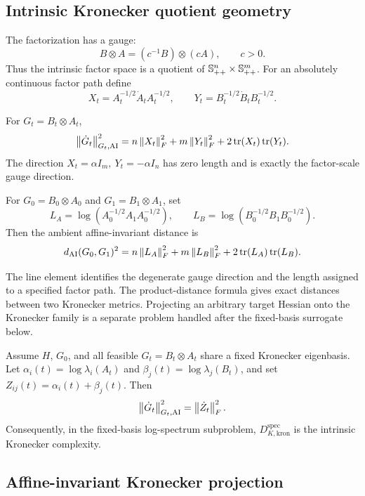 \subsection{Intrinsic Kronecker quotient geometry}

The factorization has a gauge:
\[
  B\otimes A=(c^{-1}B)\otimes(cA),\qquad c>0.
\]
Thus the intrinsic factor space is a quotient of
\(\mathbb S_{++}^n\times\mathbb S_{++}^m\). For an absolutely continuous factor path define
\[
  X_t=A_t^{-1/2}\dot A_tA_t^{-1/2},\qquad
  Y_t=B_t^{-1/2}\dot B_tB_t^{-1/2}.
\]

\begin{proposition}
\label{prop:kron-line-element}
For \(G_t=B_t\otimes A_t\),
\[
  \left\lVert \dot G_t\right\rVert_{G_t,\mathrm{AI}}^2
  =
  n\left\lVert X_t\right\rVert_F^2
  +
  m\left\lVert Y_t\right\rVert_F^2
  +
  2\operatorname{tr}(X_t)\operatorname{tr}(Y_t).
\]
The direction \(X_t=\alpha I_m,\ Y_t=-\alpha I_n\) has zero length and is
exactly the factor-scale gauge direction.
\end{proposition}

\begin{proposition}
\label{prop:kron-product-distance}
For \(G_0=B_0\otimes A_0\) and \(G_1=B_1\otimes A_1\), set
\[
  L_A=\log(A_0^{-1/2}A_1A_0^{-1/2}),\qquad
  L_B=\log(B_0^{-1/2}B_1B_0^{-1/2}).
\]
Then the ambient affine-invariant distance is
\[
  d_{\mathrm{AI}}(G_0,G_1)^2
  =
  n\left\lVert L_A\right\rVert_F^2+m\left\lVert L_B\right\rVert_F^2
  +2\operatorname{tr}(L_A)\operatorname{tr}(L_B).
\]
\end{proposition}

The line element identifies the degenerate gauge direction and the length
assigned to a specified factor path. The product-distance formula gives exact
distances between two Kronecker metrics. Projecting an arbitrary target Hessian
onto the Kronecker family is a separate problem handled after the fixed-basis
surrogate below.

\begin{proposition}
\label{prop:kron-fixed-basis}
Assume \(H\), \(G_0\), and all feasible \(G_t=B_t\otimes A_t\) share a fixed
Kronecker eigenbasis. Let \(\alpha_i(t)=\log\lambda_i(A_t)\) and
\(\beta_j(t)=\log\lambda_j(B_t)\), and set \(Z_{ij}(t)=\alpha_i(t)+\beta_j(t)\).
Then
\[
  \left\lVert \dot G_t\right\rVert_{G_t,\mathrm{AI}}^2=\left\lVert \dot Z_t\right\rVert_F^2.
\]
Consequently, in the fixed-basis log-spectrum subproblem,
\(D_{K,\mathrm{kron}}^{\mathrm{spec}}\) is the intrinsic Kronecker complexity.
\end{proposition}

\subsection{Affine-invariant Kronecker projection}

